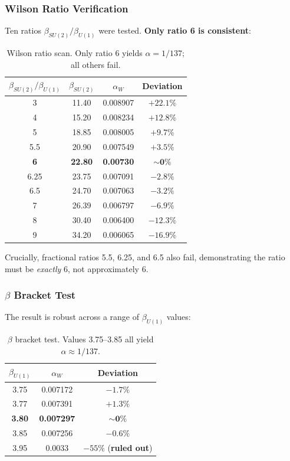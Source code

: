 \subsubsection{Wilson Ratio Verification}

Ten ratios $\beta_{SU(2)}/\beta_{U(1)}$ were tested. \textbf{Only ratio 6 is consistent}:

\begin{table}[h]
\centering
\caption{Wilson ratio scan. Only ratio 6 yields $\alpha = 1/137$; all others fail.}\label{tab:ratio-scan}
\begin{tabular}{cccc}
\toprule
$\beta_{SU(2)}/\beta_{U(1)}$ & $\beta_{SU(2)}$ & $\alpha_W$ & Deviation \\
\midrule
3 & 11.40 & 0.008907 & $+22.1\%$ \\
4 & 15.20 & 0.008234 & $+12.8\%$ \\
5 & 18.85 & 0.008005 & $+9.7\%$ \\
5.5 & 20.90 & 0.007549 & $+3.5\%$ \\
\textbf{6} & \textbf{22.80} & \textbf{0.00730} & $\mathbf{\sim 0\%}$ \\
6.25 & 23.75 & 0.007091 & $-2.8\%$ \\
6.5 & 24.70 & 0.007063 & $-3.2\%$ \\
7 & 26.39 & 0.006797 & $-6.9\%$ \\
8 & 30.40 & 0.006400 & $-12.3\%$ \\
9 & 34.20 & 0.006065 & $-16.9\%$ \\
\bottomrule
\end{tabular}
\end{table}

Crucially, fractional ratios 5.5, 6.25, and 6.5 also fail, demonstrating the ratio must be \textit{exactly} 6, not approximately 6.

\subsubsection{$\beta$ Bracket Test}

The result is robust across a range of $\beta_{U(1)}$ values:

\begin{table}[h]
\centering
\caption{$\beta$ bracket test. Values 3.75--3.85 all yield $\alpha \approx 1/137$.}\label{tab:beta-bracket}
\begin{tabular}{ccc}
\toprule
$\beta_{U(1)}$ & $\alpha_W$ & Deviation \\
\midrule
3.75 & 0.007172 & $-1.7\%$ \\
3.77 & 0.007391 & $+1.3\%$ \\
\textbf{3.80} & \textbf{0.007297} & $\mathbf{\sim 0\%}$ \\
3.85 & 0.007256 & $-0.6\%$ \\
3.95 & 0.0033 & $-55\%$ (\textbf{ruled out}) \\
\bottomrule
\end{tabular}
\end{table}


